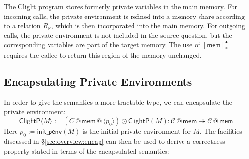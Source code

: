 \documentclass[acmsmall,screen,review,anonymous]{acmart}
\newcommand{\kw}[1]{\ensuremath{ \mathsf{#1} }}
\begin{document}
The Clight program
stores formerly private variables in the main memory.
For incoming calls,
the private environment is refined
into a memory share according to a relation $R_\kw{P}$,
which is then incorporated into the main memory.
For outgoing calls,
the private environment is not included in the source question,
but the corresponding variables are part of the target memory.
The use of $[\kw{mem}]_*^\bullet$
requires the callee to return
this region of the memory unchanged.

\subsection{Encapsulating Private Environments}

In order to give the semantics
a more tractable type,
we can encapsulate the private environment:
\[
  \kw{ClightP} \langle M \rangle :=
    (C \mathbin@ \kw{mem} \mathbin@ \langle p_0 \rangle) \odot
    \kw{ClightP}(M)
    :
    \mathcal{C} \mathbin@ \kw{mem} \twoheadrightarrow
    \mathcal{C} \mathbin@ \kw{mem}
\]
Here $p_0 := \kw{init\_penv}(M)$ is the initial private environment for $M$.
The facilities discussed in \S\ref{sec:overview:encap}
can then be used to
derive a correctness property
stated in terms of the encapsulated semantics:
\end{document}
